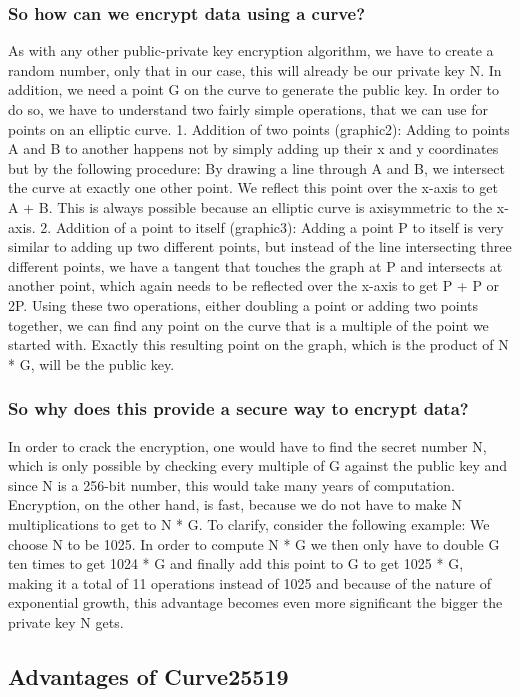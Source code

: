 \subsubsection{So how can we encrypt data using a curve?}
As with any other public-private key encryption algorithm, we have to create a random number, only that in our case, this will already be our private key N. In addition, we need a point G on the curve to generate the public key. In order to do so, we have to understand two fairly simple operations, that we can use for points on an elliptic curve. 
1. Addition of two points (graphic2): Adding to points A and B to another happens not by simply adding up their x and y coordinates but by the following procedure: By drawing a line through A and B, we intersect the curve at exactly one other point. We reflect this point over the x-axis to get A + B. This is always possible because an elliptic curve is axisymmetric to the x-axis.
2. Addition of a point to itself (graphic3): Adding a point P to itself is very similar to adding up two different points, but instead of the line intersecting three different points, we have a tangent that touches the graph at P and intersects at another point, which again needs to be reflected over the x-axis to get P + P or 2P.
Using these two operations, either doubling a point or adding two points together, we can find any point on the curve that is a multiple of the point we started with. Exactly this resulting point on the graph, which is the product of N * G, will be the public key.

\subsubsection{So why does this provide a secure way to encrypt data?}
In order to crack the encryption, one would have to find the secret number N, which is only possible by checking every multiple of G against the public key and since N is a 256-bit number, this would take many years of computation.
Encryption, on the other hand, is fast, because we do not have to make N multiplications to get to N * G. To clarify, consider the following example:
We choose N to be 1025. In order to compute N * G we then only have to double G ten times to get 1024 * G and finally add this point to G to get 1025 * G, making it a total of 11 operations instead of 1025 and because of the nature of exponential growth, this advantage becomes even more significant the bigger the private key N gets.

\subsection{Advantages of Curve25519}
